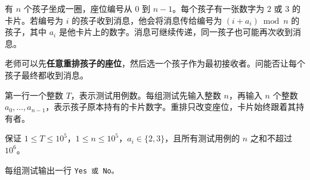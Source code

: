 \Legend
有 $n$ 个孩子坐成一圈，座位编号从 $0$ 到 $n-1$。每个孩子有一张数字为 $2$ 或 $3$ 的卡片。若编号为 $i$ 的孩子收到消息，他会将消息传给编号为 $(i+a_i)\bmod n$ 的孩子，其中 $a_i$ 是他卡片上的数字。消息可继续传递，同一孩子也可能再次收到消息。

老师可以先\textbf{任意重排孩子的座位}，然后选一个孩子作为最初接收者。问能否让每个孩子最终都收到消息。

\Input

第一行一个整数 $T$，表示测试用例数。每组测试先输入整数 $n$，再输入 $n$ 个整数 $a_0,\ldots,a_{n-1}$，表示孩子原本持有的卡片数字。重排只改变座位，卡片始终跟着其持有者。

保证 $1\le T\le10^5$，$1\le n\le10^5$，$a_i\in\{2,3\}$，且所有测试用例的 $n$ 之和不超过 $10^6$。

\Output

每组测试输出一行 \tt{Yes} 或 \tt{No}。

\Examples

\begin{example}
\end{example}
